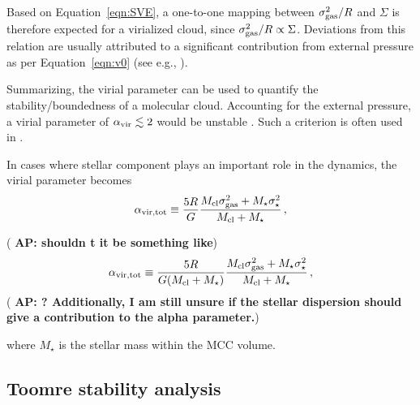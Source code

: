 \IfFileExists{emulateapjlegacy.cls}{\documentclass[iop]{emulateapjlegacy}}{\documentclass[iop]{emulateapj}}
\newcommand{\AP}[1]{({\bf \color{apcolor} AP: #1})}
\begin{document}
Based on Equation~\ref{eqn:SVE}, a one-to-one mapping between $\sigma_{\rm gas}^2/R$ and $\Sigma$ is therefore expected for a virialized cloud, since $\sigma_{\rm gas}^2/R\propto\Sigma$. Deviations from this relation are usually attributed to a significant contribution from external pressure as per Equation~\ref{eqn:v0} (see e.g., \citealt{Heyer09a, Hughes10a, Hughes13b, Meidt13a}).

Summarizing, the virial parameter can be used to quantify the stability/boundedness of 
    a molecular cloud.
Accounting for the external pressure, a virial parameter of $\alpha_{\rm vir}\lesssim2$ would be unstable \citep{bertoldi:1992}.
%
Such a criterion is often used in \obs \citep[see e.g., ][]{Kauffmann17b}. 

In cases where stellar component plays an important role in the dynamics, the virial parameter becomes
\begin{equation}
\alpha_{\rm vir, tot} \equiv \frac{5 R}{G} \frac{M_{\rm cl} \sigma_{\rm gas}^2 + M_{\star} \sigma_\star^2}
					       {M_{\rm cl} + M_{\star} }\,,
\label{eqn:alpha_tot}
\end{equation}

\AP{shouldn t it be something like}
\begin{equation}
\alpha_{\rm vir, tot} \equiv \frac{5 R}{G (M_{\rm cl} + M_{\star})} \frac{M_{\rm cl} \sigma_{\rm gas}^2 + M_{\star} \sigma_\star^2}
					       {M_{\rm cl} + M_{\star} }\,,
\label{eqn:alpha_tot}
\end{equation}
\AP{? Additionally, I am still unsure if the stellar dispersion should give a contribution to the alpha parameter.}


where $M_\star$ is the stellar mass within the MCC volume.


\subsection{Toomre stability analysis}\label{sec:Q}
\end{document}
